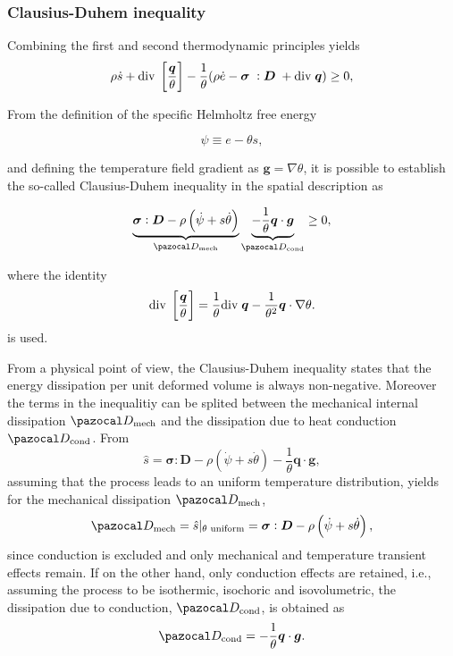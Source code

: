 \subsubsection{Clausius-Duhem inequality}

Combining the first and second thermodynamic principles yields
\begin{equation}
    \rho\dot s + \text{div}\;\left[\frac{\bm{q}}{\theta}\right] -\frac{1}{\theta}(\rho\dot e -\bm{\sigma}\;:\bm D\; +\text{div}\;\bm{q})\geq 0,
\end{equation}

From the definition of the specific Helmholtz free energy
\begin{highlight}
\begin{equation} \label{eq:def_helmholtz_free_energy}
    \psi \equiv e -\theta s,
\end{equation}
\end{highlight}
and defining the temperature field gradient as $\bm g=\nabla \theta$, it is possible to establish the so-called Clausius-Duhem inequality in the spatial description as
\begin{highlight}
    \begin{equation}
        \underbrace{\mat \sigma:\mat D - \rho\left(\dot \psi +s\dot \theta\right)}_{\pazocal D_\text{mech}} \underbrace{-\frac{1}{\theta}\vect q\cdot \vect g }_{\pazocal D_\text{cond}}\geq 0, \label{eq:clasius_duhem_eq}
    \end{equation}
\end{highlight}
where the identity
\begin{equation}
    \text{div}\;\left[\frac{\bm{q}}{\theta}\right] =\frac{1}{\theta}\text{div}\;\bm{q} -\frac{1}{\theta^2}\bm{q}\cdot \nabla \theta.
\end{equation}
is used.

From a physical point of view, the Clausius-Duhem inequality states that the energy dissipation per unit deformed volume is always non-negative.
Moreover the terms in the inequalitiy can be splited between the mechanical internal dissipation \(\pazocal D_\text{mech}\) and the dissipation due to heat conduction \(\pazocal D_\text{cond}\).
From
\begin{equation}
\hat s = \bm \sigma :\bm D - \rho \left(\dot \psi  +s \dot \theta\right) -\frac{1}{\theta}\bm q\cdot\bm g,
\end{equation}
assuming that the process leads to an uniform temperature distribution, yields for the mechanical dissipation \(\pazocal D_\text{mech}\),
\begin{equation}
\pazocal D_\text{mech} = \hat{s}|_{\text{$\theta$ uniform} }= \bm \sigma:\bm D - \rho \left(\dot \psi + s \dot \theta\right),
\end{equation}
since conduction is excluded and only mechanical and temperature transient effects remain.
If on the other hand, only conduction effects are retained, i.e., assuming the process to be isothermic, isochoric and isovolumetric, the dissipation due to conduction, \(\pazocal D_\text{cond}\), is obtained as
\begin{equation}
\pazocal D_\text{cond} = - \frac{1}{\theta} \bm q\cdot \bm g.
\end{equation}

